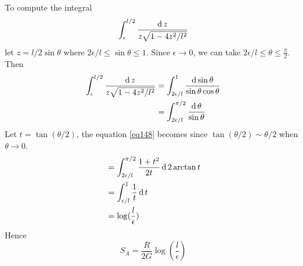 \subsubsection{}
To compute the integral
\[
\int_{\epsilon}^{l/2} \frac{\operatorname{d} z}{z \sqrt{1-4z^2/l^2}}
\]
let $z=l/2 \sin \theta$ where $2\epsilon/l \leq  \sin \theta \leq 1$. Since $\epsilon \to 0$, we can take $ 2 \epsilon/l \leq \theta \leq \frac{\pi}{2}$. Then
\begin{equation}
\label{eq148}
	\begin{split}
	\int_{\epsilon}^{l/2} \frac{\operatorname{d} z}{z \sqrt{1-4 z^2/l^2}} & = \int_{2\epsilon/l}^{1} \frac{\operatorname{d} \sin \theta}{\sin \theta \cos \theta}\\
	& = \int_{2\epsilon/l}^{\pi/2} \frac{\operatorname{d} \theta}{\sin \theta}
	\end{split}
\end{equation}
Let $t = \tan (\theta/2)$, the equation \ref{eq148} becomes since $\tan(\theta/2) \sim  \theta/2$ when $\theta \to 0$.
\begin{equation}
	\begin{split}
	&=\int_{2\epsilon/l}^{\pi/2} \frac{1+t^2}{2t} \operatorname{d} 2\arctan t\\
	&= \int_{\epsilon/l}^{1}\frac{1}{t} \operatorname{d} t\\
	& = \log (\frac{l}{\epsilon})
	\end{split}
\end{equation}
Hence 
\begin{equation}
	S_A = \frac{R}{2G} \log \left( \frac{l}{\epsilon} \right)
\end{equation}
